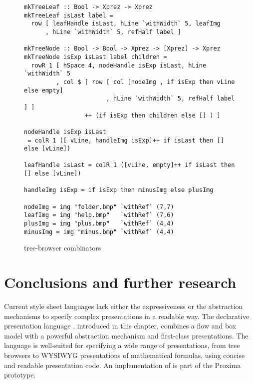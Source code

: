 \begin{figure}[t] %
\begin{small}
\begin{center}
\begin{footnotesize}
\begin{verbatim}
mkTreeLeaf :: Bool -> Xprez -> Xprez
mkTreeLeaf isLast label = 
  row [ leafHandle isLast, hLine `withWidth` 5, leafImg
      , hLine `withWidth` 5, refHalf label ] 

mkTreeNode :: Bool -> Bool -> Xprez -> [Xprez] -> Xprez
mkTreeNode isExp isLast label children =
  rowR 1 [ hSpace 4, nodeHandle isExp isLast, hLine `withWidth` 5
         , col $ [ row [ col [nodeImg , if isExp then vLine else empty]
                       , hLine `withWidth` 5, refHalf label ] ]
                 ++ (if isExp then children else [] ) ]

nodeHandle isExp isLast 
 = colR 1 ([ vLine, handleImg isExp]++ if isLast then [] else [vLine])

leafHandle isLast = colR 1 ([vLine, empty]++ if isLast then [] else [vLine])

handleImg isExp = if isExp then minusImg else plusImg

nodeImg = img "folder.bmp" `withRef` (7,7)
leafImg = img "help.bmp"   `withRef` (7,6)
plusImg = img "plus.bmp"   `withRef` (4,4)
minusImg = img "minus.bmp" `withRef` (4,4)
\end{verbatim}
\end{footnotesize}
\caption{{\Xprez} tree-browser combinators}\label{treeCombinators} 
\end{center}
\end{small}
\end{figure}


%																
\section{Conclusions and further research}  \label{sect:conclusions}

Current style sheet languages lack either the expressiveness or the abstraction mechanisms to specify complex presentations in a readable way. The declarative presentation language {\Xprez}, introduced in this chapter, combines a flow and box model with a powerful abstraction mechanism and first-class presentations. The language is well-suited for specifying a wide range of presentations, from tree browsers to WYSIWYG presentations of mathematical formulas, using concise and readable presentation code. An implementation of {\Xprez} is part of the Proxima prototype. 

